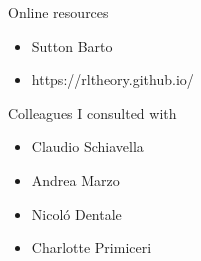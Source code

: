 \documentclass[14pt,a4paper]{extarticle}
\begin{document}
Online resources
\begin{itemize}
\item Sutton Barto
\item https://rltheory.github.io/
\end{itemize}

Colleagues I consulted with
\begin{itemize}
\item Claudio Schiavella
\item Andrea Marzo
\item Nicoló Dentale
\item Charlotte Primiceri
\end{itemize}
\end{document}
